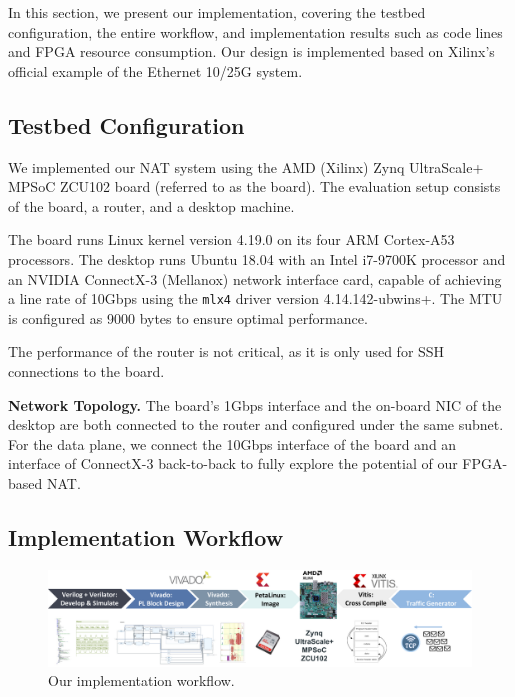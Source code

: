In this section, we present our implementation, covering the testbed configuration, the entire workflow, and implementation results such as code lines and FPGA resource consumption. Our design is implemented based on Xilinx's official example of the Ethernet 10/25G system.

\subsection{Testbed Configuration}

We implemented our NAT system using the AMD (Xilinx) Zynq UltraScale+ MPSoC ZCU102 board (referred to as the board). The evaluation setup consists of the board, a router, and a desktop machine.

The board runs Linux kernel version 4.19.0 on its four ARM Cortex-A53 processors. The desktop runs Ubuntu 18.04 with an Intel i7-9700K processor and an NVIDIA ConnectX-3 (Mellanox) network interface card, capable of achieving a line rate of 10Gbps using the \verb|mlx4| driver version 4.14.142-ubwins+. The MTU is configured as 9000 bytes to ensure optimal performance.

The performance of the router is not critical, as it is only used for SSH connections to the board.

\textbf{Network Topology.} The board's 1Gbps interface and the on-board NIC of the desktop are both connected to the router and configured under the same subnet. For the data plane, we connect the 10Gbps interface of the board and an interface of ConnectX-3 back-to-back to fully explore the potential of our FPGA-based NAT.

\subsection{Implementation Workflow}

\begin{figure}[h]
    \centering
    \includegraphics[width=500pt]{images/implworkflow.pdf}
    \caption{Our implementation workflow.}
    \label{fig:workflow}
\end{figure}


